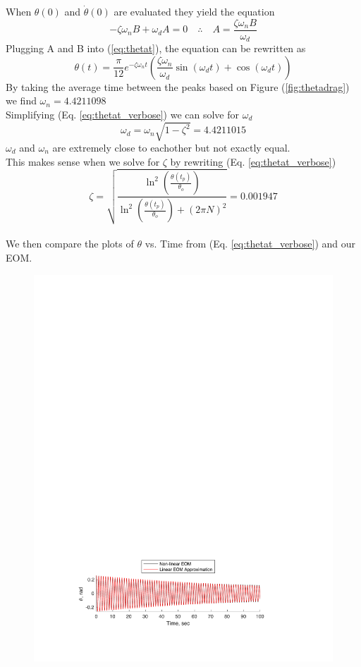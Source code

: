 \documentclass[12pt]{report}
\begin{document}
\begin{flushleft}
\begin{equation}
\end{equation}
When $\theta(0)$ and $\dot{\theta}(0)$ are evaluated they yield the equation
$$-\zeta\omega_nB+\omega_dA=0 \quad\therefore\quad A=\frac{\zeta\omega_nB}{\omega_d}$$
Plugging A and B into (\ref{eq:thetat}), the equation can be rewritten as
\begin{equation} \label{eq:thetat_verbose}
\theta(t)=\frac{\pi}{12}e^{-\zeta\omega_nt}\left(\frac{\zeta\omega_n}{\omega_d}\sin(\omega_dt)+\cos(\omega_dt)\right)
\end{equation}
\newpage
By taking the average time between the peaks based on Figure (\ref{fig:thetadrag}) we find $\omega_n=4.4211098$\\
Simplifying (Eq. \ref{eq:thetat_verbose}) we can solve for $\omega_d$
$$\omega_d = \omega_n\sqrt{1-\zeta^2} = 4.4211015$$
$\omega_d$ and $\omega_n$ are extremely close to eachother but not exactly equal.\\
This makes sense when we solve for $\zeta$ by rewriting (Eq. \ref{eq:thetat_verbose})
$$\zeta = \sqrt{\frac{\ln^2(\frac{\theta(t_p)}{\theta_o})}{\ln^2(\frac{\theta(t_p)}{\theta_o})+(2\pi N)^2}} = 0.001947$$
\\We then compare the plots of $\theta$ vs. Time from (Eq. \ref{eq:thetat_verbose}) and our EOM.\\
\begin{figure}[ht]
  \includegraphics[center]{compare}

\end{figure}
\end{flushleft}
\end{document}
